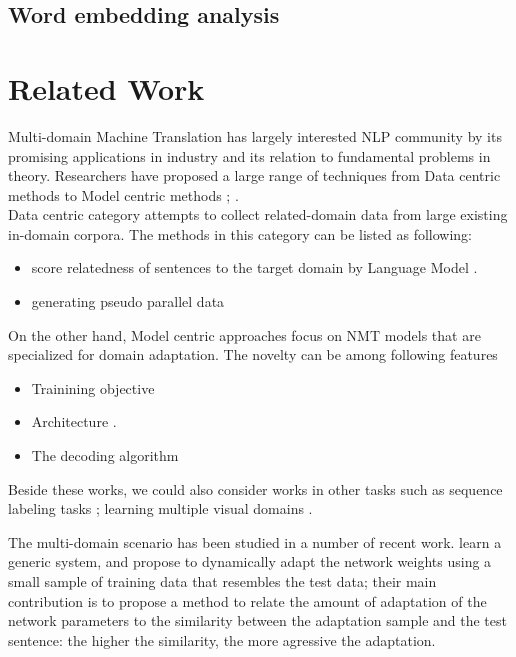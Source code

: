 \documentclass[11pt,a4paper]{article}
\newcommand{\fyTodo}[1]{\Todo[FY:]{\textcolor{orange}{#1}}}
\newcommand{\fyDone}[1]{\done[FY]\Todo[FY:]{\textcolor{orange}{#1}}}
\begin{document}
\subsection{Word embedding analysis}

\section{Related Work \label{sec:related_work}}
\fyDone{Add standard labels to sections}
\fyDone{Related work goes last}
\fyTodo{Compare also to Peng 2017}

Multi-domain Machine Translation has largely interested NLP community by its promising applications in industry and its relation to fundamental problems in theory. Researchers have proposed a large range of techniques from Data centric methods to Model centric methods \cite{Chu18asurvey}; \cite{Chu2017comparison}.\\ Data centric category attempts to collect related-domain data from large existing in-domain corpora. The methods in this category can be listed as following:
\fyTodo{Organize refs}
\begin{itemize}
\item score relatedness of sentences to the target domain by Language Model \cite{Moore2010selection,Axelrod2011domain,Duh2013selection}.
\item generating pseudo parallel data \cite{Utiyama2003measure,Wang2016connecting,Wang2014neural}
\end{itemize}
On the other hand, Model centric approaches focus on NMT models that are specialized for domain adaptation. The novelty can be among following features
\begin{itemize}
\item Trainining objective \cite{Luong2015SNMT,Senrich2016Mono,Wang2017Instance,Chen2017Cost,Miceli2017Regularize,Zhang18sentence}
\item Architecture \cite{gulcehre2016monolingual,Zhang16topicinformed,Kobus17domaincontrol,Britz2017mixing,Biao2017CARENMT,Britz2017mixing,Thompson18freezing,Michel2018extreme}.
\item The decoding algorithm \cite{gulcehre2016monolingual,Khayrallah2017lattice}
\end{itemize}

Beside these works, we could also consider works in other tasks such as sequence labeling tasks \cite{Daume07frustratingly}; learning multiple visual domains \cite{Rebuffi2017Visual}.

The multi-domain scenario has been studied in a number of recent work. \citet{Farajian17multidomain} learn a generic system, and propose to dynamically adapt the network weights using a small sample of training data that resembles the test data; their main contribution is to propose a method to relate the amount of adaptation of the network parameters to the similarity between the adaptation sample and the test sentence: the higher the similarity, the more agressive the adaptation.
\end{document}
